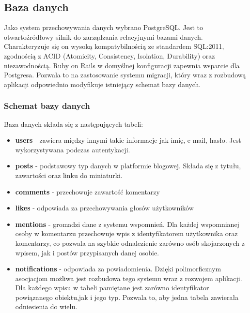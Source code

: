 \documentclass[declaration,shortabstract]{iithesis}
\begin{document}
\subsection{Baza danych}
Jako system przechowywania danych wybrano PostgreSQL. Jest to otwartoźródłowy silnik do zarządzania relacyjnymi bazami danych. Charakteryzuje się on wysoką kompatybilnością ze standardem SQL:2011, zgodnością z ACID (Atomicity, Consistency, Isolation, Durability) oraz niezawodnością. Ruby on Rails w domyślnej konfiguracji zapewnia wsparcie dla Postgresa. Pozwala to na zastosowanie systemu migracji, który wraz z rozbudową aplikacji odpowiednio modyfikuje istniejący schemat bazy danych.

\subsubsection{Schemat bazy danych}
Baza danych składa się z następujących tabeli: 
\begin{itemize}
    \item \textbf{users} - zawiera między innymi takie informacje jak imię, e-mail, hasło. Jest wykorzystywana podczas autentykacji.
    \item \textbf{posts} - podstawowy typ danych w platformie blogowej. Składa się z tytułu, zawartości oraz linku do miniaturki.
    \item \textbf{comments} - przechowuje zawartość komentarzy
    \item \textbf{likes} - odpowiada za przechowywania głosów użytkowników
    \item \textbf{mentions} - gromadzi dane z systemu wspomnień. Dla każdej wspomnianej osoby w komentarzu przechowuje wpis z identyfikatorem użytkownika oraz komentarzy, co pozwala na szybkie odnalezienie zarówno osób skojarzonych z wpisem, jak i postów przypisanych danej osobie.
    \item \textbf{notifications} - odpowiada za powiadomienia. Dzięki polimorficznym asocjacjom możliwa jest rozbudowa tego systemu wraz z rozwojem aplikacji. Dla każdego wpisu w tabeli pamiętane jest zarówno identyfikator powiązanego obiektu,jak i jego typ. Pozwala to, aby jedna tabela zawierała odniesienia do wielu.
\end{itemize}
\end{document}
